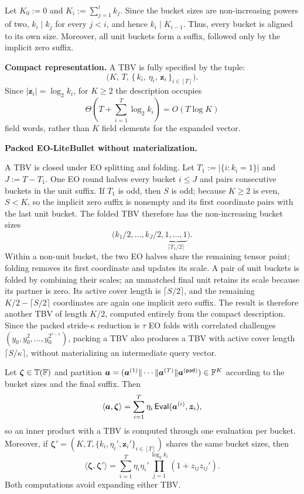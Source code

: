 Let $K_0:=0$ and $K_i:=\sum_{j=1}^i k_j$.  Since the bucket sizes are
non-increasing powers of two, $k_i\mid k_j$ for every $j<i$, and hence
$k_i\mid K_{i-1}$.  Thus, every bucket is aligned to its own size.  Moreover,
all unit buckets form a suffix, followed only by the implicit zero suffix.

\mysmallskip
{\bf Compact representation.}
A TBV is fully specified by the tuple:
\[
    \big(
        K,\,
        T,\,
        \{\, k_i,\, \eta_i,\, \bm{z}_i\,\}_{i \in [T]}
    \big).
\]
Since $|\bm z_i|=\log_2 k_i$, for $K\ge2$ the description occupies
\[
    \Theta\!\left(T+\sum_{i=1}^T\log_2 k_i\right)
    =O(T\log K)
\]
field words, rather than $K$ field elements for the expanded vector.


\mysmallskip
\noindent
\textbf{Packed EO-LiteBullet without materialization.}

A TBV is closed under EO splitting and folding.  Let
$T_1:=|\{i:k_i=1\}|$ and $J:=T-T_1$.  One EO round halves every bucket
$i\le J$ and pairs consecutive buckets in the unit suffix.  If $T_1$ is odd,
then $S$ is odd; because $K\ge2$ is even, $S<K$, so the implicit zero suffix is
nonempty and its first coordinate pairs with the last unit bucket.  The folded
TBV therefore has the non-increasing bucket sizes
\[
  \bigl(k_1/2,\ldots,k_J/2,
  \underbrace{1,\ldots,1}_{\lceil T_1/2\rceil}\bigr).
\]
Within a non-unit bucket, the two EO halves share the remaining tensor point;
folding removes its first coordinate and updates its scale.  A pair of unit
buckets is folded by combining their scales; an unmatched final unit retains
its scale because its partner is zero.  Its active cover length is
$\lceil S/2\rceil$, and the remaining $K/2-\lceil S/2\rceil$ coordinates are
again one implicit zero suffix.  The result is therefore another TBV of length
$K/2$, computed entirely from the compact description.  Since
the packed stride-$\kappa$ reduction is $\tau$ EO folds with correlated
challenges $(y_0,y_0^2,\ldots,y_0^{2^{\tau-1}})$, packing a TBV also produces a
TBV with active cover length $\lceil S/\kappa\rceil$, without materializing an
intermediate query vector.


\begin{property}
\label{prop:iptbv}
\label{prop:mixiptbv}
Let $\bm\zeta\in{\mathbb{T}}({\mathbb{F}})$ and partition
$\bm a=(\bm a^{(1)}\|\cdots\|\bm a^{(T)}\|\bm a^{(\mathsf{pad})})
\in{\mathbb{F}}^K$ according to the bucket sizes and the final suffix.  Then
\begin{equation}
\label{eq:mixtbvip}
    \langle\bm a,\bm\zeta\rangle
    =\sum_{i=1}^T\eta_i\,
      {\sf Eval}(\bm a^{(i)},\bm z_i),
\end{equation}
so an inner product with a TBV is computed through one evaluation per bucket.
Moreover, if
$\bm\zeta'=(K,T,\{k_i,\eta_i',\bm z_i'\}_{i\in[T]})$ shares the same
bucket sizes, then
\[
    \langle\bm\zeta,\bm\zeta'\rangle
    =\sum_{i=1}^T\eta_i\eta_i'
      \prod_{j=1}^{\log_2 k_i}(1+z_{ij}z_{ij}').
\]
Both computations avoid expanding either TBV.
\end{property}

